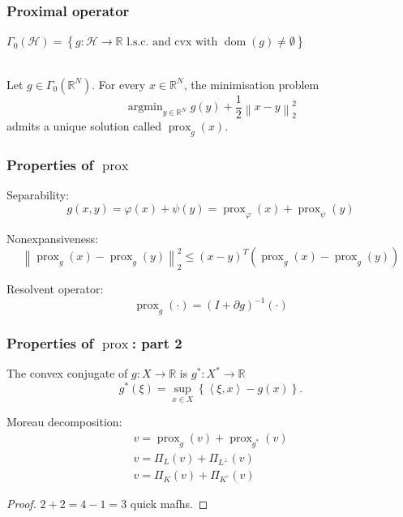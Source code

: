\documentclass[aspectratio=169]{beamer}
\DeclareMathOperator{\Prox}{prox}
\newcommand{\prox}[2]{\Prox_{#1}\left({#2}\right)}
\newcommand{\RR}{\mathbb{R}}
\newcommand{\normtwosq}[1]{\left\|#1\right\|_2^2}
\renewcommand{\phi}{\varphi}
\DeclareMathOperator*{\argmin}{argmin}
\DeclareMathOperator{\dom}{dom}
\begin{document}
		\begin{frame}
		\frametitle{Proximal operator}
		$\Gamma_0(\mathcal{H}) = \left\{g:\mathcal{H}\to\RR\text{ l.s.c. and cvx with } \dom(g)\ne\emptyset\right\}$
		\quad \\ \quad \\
		\begin{definition}
		Let $g\in\Gamma_0(\RR^N)$. For every $x \in \RR^N$, the minimisation problem
		\begin{equation}
		\nonumber
		\argmin_{y\in\RR^N} g(y) + \frac{1}{2}\normtwosq{x-y}
		\end{equation}
		admits a unique solution called $\prox{g}{x}$.
		\end{definition}
		\end{frame}

		\begin{frame}
		\frametitle{Properties of $\Prox$}
		Separability:
		\begin{equation}
		\nonumber g(x,y) = \phi(x)+\psi(y) = \prox{\phi}{x} + \prox{\psi}{y}
		\end{equation}
		
		{Nonexpansiveness}:
		\begin{equation}
		\nonumber \normtwosq{\prox{g}{x}-\prox{g}{y}} \le \left(x-y\right)^T\left(\prox{g}{x} - \prox{g}{y}\right)
		\end{equation}
		
		Resolvent operator: 
		\begin{equation}
		\nonumber \prox{g}{\cdot} = \left(I + \partial g\right)^{-1} (\cdot)
		\end{equation}
		\end{frame}
		
		\begin{frame}
		\frametitle{Properties of $\Prox$: part 2}
		\begin{definition}
		The convex conjugate of $g:X\to\RR$ is $g^*:X^*\to\RR$
		\begin{equation}
		\nonumber
		g^*(\xi) = \sup_{x\in X}\left\{\left<\xi,x\right>-g(x)\right\}.
		\end{equation}
		\end{definition}		
		\pause
		{Moreau decomposition}:
		\begin{gather}
		\nonumber v = \prox{g}{v} + \prox{g^*}{v}\\
		\nonumber v = \Pi_L(v) + \Pi_{L^\perp}(v)\\
		\nonumber v = \Pi_K(v) + \Pi_{K^\circ}(v)
		\end{gather}
		\begin{proof}
		$2+2=4-1=3$ quick mafhs.
		\end{proof}
		\end{frame}
		
\end{document}
